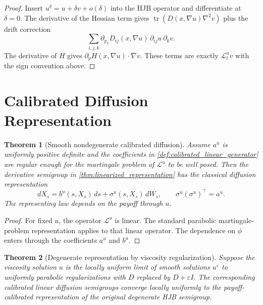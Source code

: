 \documentclass[11pt]{amsart}
\newtheorem{theorem}{Theorem}[section]
\theoremstyle{definition}
\theoremstyle{remark}
\newcommand{\Lcal}{\mathcal L}
\newcommand{\Tr}{\operatorname{tr}}
\begin{document}
\begin{proof}
Insert $u^\delta=u+\delta v+o(\delta)$ into the HJB operator and differentiate
at $\delta=0$.  The derivative of the Hessian term gives
$\Tr(D(x,\nabla u)\nabla^2 v)$ plus the drift correction
\[
  \sum_{i,j,k}\partial_{p_k}D_{ij}(x,\nabla u)\,\partial_{ij}u\,\partial_k v.
\]
The derivative of $H$ gives $\partial_pH(x,\nabla u)\cdot\nabla v$.  These
terms are exactly $\Lcal_t^u v$ with the sign convention above.
\end{proof}

\section{Calibrated Diffusion Representation}

\begin{theorem}[Smooth nondegenerate calibrated diffusion]
\label{thm:smooth_diffusion_representation}
Assume $a^u$ is uniformly positive definite and the coefficients in
\cref{def:calibrated_linear_generator} are regular enough for the martingale
problem of $\Lcal^u$ to be well posed.  Then the derivative semigroup in
\cref{thm:linearized_representation} has the classical diffusion
representation
\begin{equation}
  dX_s=b^u(s,X_s)\,ds+\sigma^u(s,X_s)\,dW_s,
  \qquad \sigma^u(\sigma^u)^\top=a^u .
\end{equation}
The representing law depends on the payoff through $u$.
\end{theorem}

\begin{proof}
For fixed $u$, the operator $\Lcal^u$ is linear.  The standard parabolic
martingale-problem representation
\cite{stroock2007multidimensional,FlemingSoner2006} applies to that linear
operator.  The
dependence on $\phi$ enters through the coefficients $a^u$ and $b^u$.
\end{proof}

\begin{theorem}[Degenerate representation by viscosity regularization]
\label{thm:regularized_diffusion_representation}
Suppose the viscosity solution $u$ is the locally uniform limit of smooth
solutions $u^\varepsilon$ to uniformly parabolic regularizations with
$D$ replaced by $D+\varepsilon I$.  The corresponding calibrated linear
diffusion semigroups converge locally uniformly to the payoff-calibrated
representation of the original degenerate HJB semigroup.
\end{theorem}
\end{document}
